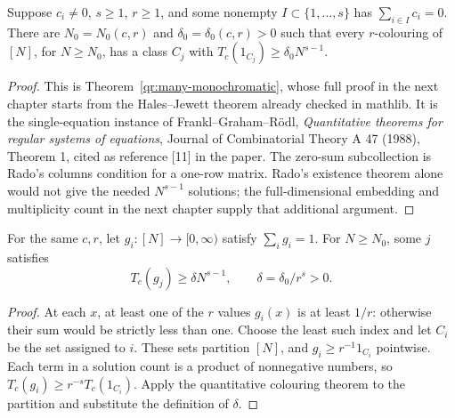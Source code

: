 \begin{lemma}
\label{app:fgr-dependency}
\leanok
{}
Suppose $c_i\ne0$, $s\geq1$, $r\geq1$, and some nonempty
$I\subset\{1,\ldots,s\}$ has $\sum_{i\in I}c_i=0$.
There are $N_0=N_0(c,r)$ and $\delta_0=\delta_0(c,r)>0$ such that every
$r$-colouring of $[N]$, for $N\geq N_0$, has a class $C_j$ with
$T_c(1_{C_j})\geq\delta_0N^{s-1}$.
\end{lemma}
\begin{proof}
This is Theorem~\ref{qr:many-monochromatic}, whose full proof in the next
chapter starts from the Hales--Jewett theorem already checked in mathlib.
It is the single-equation instance of Frankl--Graham--R\"odl,
\emph{Quantitative theorems for regular systems of equations}, Journal of
Combinatorial Theory A 47 (1988), Theorem 1, cited as reference [11] in the
paper.  The zero-sum subcollection is Rado's columns condition for a
one-row matrix.  Rado's existence theorem alone would not give the needed
$N^{s-1}$ solutions; the full-dimensional embedding and multiplicity count
in the next chapter supply that additional argument.
\end{proof}

\begin{lemma}
\label{app:weighted-interval-count}
\leanok
{}
For the same $c,r$, let $g_i:[N]\to[0,\infty)$ satisfy $\sum_ig_i=1$.
For $N\geq N_0$, some $j$ satisfies
\[
 T_c(g_j)\geq\delta N^{s-1},\qquad \delta=\delta_0/r^s>0.
\]
\end{lemma}
\begin{proof}
At each $x$, at least one of the $r$ values $g_i(x)$ is at least $1/r$:
otherwise their sum would be strictly less than one.  Choose the least such
index and let $C_i$ be the set assigned to $i$.  These sets partition $[N]$,
and $g_i\geq r^{-1}1_{C_i}$ pointwise.  Each term in a solution count is
a product of nonnegative numbers, so
$T_c(g_i)\geq r^{-s}T_c(1_{C_i})$.
Apply the quantitative colouring theorem to the partition and
substitute the definition of $\delta$.
\end{proof}


